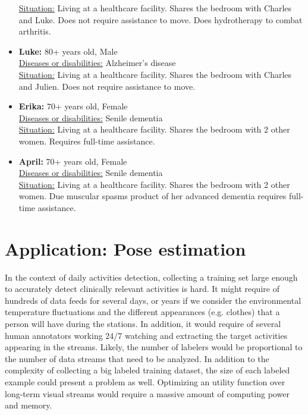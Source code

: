 \documentclass[oneside, twocolumn]{article}
\begin{document}
\begin{itemize}
			\underline{Situation:} Living at a healthcare facility. Shares the bedroom with Charles and Luke. Does not require assistance to move.  Does hydrotherapy to  combat arthritis. \\
	\item \textbf{Luke:} 80+ years old, Male \\
			\underline{Diseases or disabilities:} Alzheimer's disease \\
			\underline{Situation:} Living at a healthcare facility. Shares the bedroom with Charles and Julien. Does not require assistance to move.\\
	\item \textbf{Erika:} 70+ years old, Female \\
			\underline{Diseases or disabilities:} Senile dementia \\
			\underline{Situation:} Living at a healthcare facility. Shares the bedroom with 2 other women. Requires full-time assistance.\\
	\item \textbf{April:} 70+ years old, Female \\
			\underline{Diseases or disabilities:} Senile dementia \\
			\underline{Situation:} Living at a healthcare facility. Shares the bedroom with 2 other women. Due muscular spasms product of her advanced dementia requires full-time assistance. \\
\end{itemize}


\section{Application: Pose estimation}
\label{sec:application}

In the context of daily activities detection, collecting a training set large enough to accurately detect
clinically relevant activities is hard. It might require of hundreds of data feeds for several days, or years if
we consider the environmental temperature fluctuations and the different appearances (e.g. clothes) that a person
will have during the stations. In addition, it would require of several human annotators working 24/7 watching and
extracting the target activities appearing in the streams. Likely, the number of labelers would be proportional to
the number of data streams that need to be analyzed. In addition to the complexity of collecting a big labeled
training dataset, the size of each labeled example could present a problem as well. Optimizing an utility function
over long-term visual streams would require a massive amount of computing power and memory.
\end{document}
